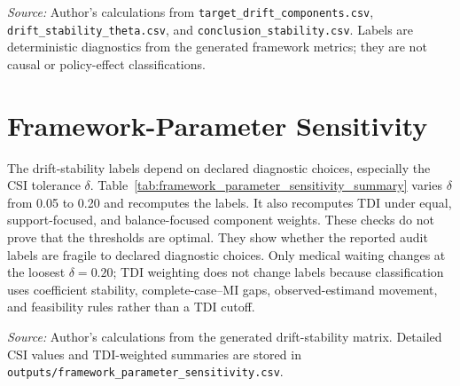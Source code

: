 \begin{table}[H]
\centering
\caption{Drift-stability summary for the poverty/social-exclusion stress-test coefficient. The table reports framework metrics generated from the outcome-by-estimand matrix; TDI summarizes target movement and CSI summarizes conclusion agreement under the declared tolerance rule.}
\label{tab:drift_stability_summary}

\vspace{0.25em}

\begin{minipage}{0.96\textwidth}
\scriptsize \textit{Source:} Author's calculations from \texttt{target\_drift\_components.csv}, \texttt{drift\_stability\_theta.csv}, and \texttt{conclusion\_stability.csv}. Labels are deterministic diagnostics from the generated framework metrics; they are not causal or policy-effect classifications.
\end{minipage}
\end{table}

\section{Framework-Parameter Sensitivity}

The drift-stability labels depend on declared diagnostic choices, especially the CSI tolerance \(\delta\). Table~\ref{tab:framework_parameter_sensitivity_summary} varies \(\delta\) from 0.05 to 0.20 and recomputes the labels. It also recomputes TDI under equal, support-focused, and balance-focused component weights. These checks do not prove that the thresholds are optimal. They show whether the reported audit labels are fragile to declared diagnostic choices. Only medical waiting changes at the loosest \(\delta=0.20\); TDI weighting does not change labels because classification uses coefficient stability, complete-case--MI gaps, observed-estimand movement, and feasibility rules rather than a TDI cutoff.

\begin{table}[H]
\centering
\caption{Framework-parameter sensitivity of final labels. CSI columns vary the tolerance parameter \(\delta\); the TDI column reports whether equal, support-focused, or balance-focused TDI weights alter any target-dependent label.}
\label{tab:framework_parameter_sensitivity_summary}

\vspace{0.25em}

\begin{minipage}{0.96\textwidth}
\scriptsize \textit{Source:} Author's calculations from the generated drift-stability matrix. Detailed CSI values and TDI-weighted summaries are stored in \texttt{outputs/framework\_parameter\_sensitivity.csv}.
\end{minipage}
\end{table}

